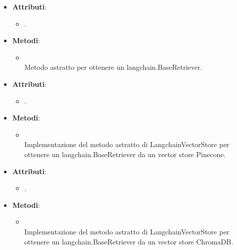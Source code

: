 \documentclass[10pt, a4paper]{article}
\begin{document}
    \label{LangchainVectorStoreDettaglio}
    \begin{itemize}
        \item \textbf{Attributi}:
        \begin{itemize}
            \item {}.
        \end{itemize}
        \item \textbf{Metodi}:
        \begin{itemize}
            \item {}\\
            Metodo astratto per ottenere un langchain.BaseRetriever.
        \end{itemize}
    \end{itemize}
    
    \label{PineconeVectorStoreDettaglio}
    \begin{itemize}
        \item \textbf{Attributi}:
        \begin{itemize}
            \item {}.
        \end{itemize}
        \item \textbf{Metodi}:
        \begin{itemize}
            \item {}\\
            Implementazione del metodo astratto di LangchainVectorStore per ottenere un langchain.BaseRetriever da un vector store Pinecone.
        \end{itemize}
    \end{itemize}
    
    \label{ChromaDBVectorStoreDettaglio}
    \begin{itemize}
        \item \textbf{Attributi}:
        \begin{itemize}
            \item {}.
        \end{itemize}
        \item \textbf{Metodi}:
        \begin{itemize}
            \item {}\\
            Implementazione del metodo astratto di LangchainVectorStore per ottenere un langchain.BaseRetriever da un vector store ChromaDB.
        \end{itemize}
    \end{itemize}
    
\end{document}
